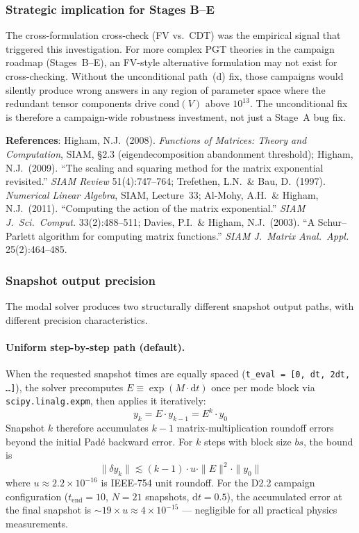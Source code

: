 \subsubsection{Strategic implication for Stages B--E}

The cross-formulation cross-check (FV vs.\ CDT) was the empirical signal that triggered this investigation. For more complex PGT theories in the campaign roadmap (Stages~B--E), an FV-style alternative formulation may not exist for cross-checking. Without the unconditional path~(d) fix, those campaigns would silently produce wrong answers in any region of parameter space where the redundant tensor components drive $\mathrm{cond}(V)$ above $10^{13}$. The unconditional fix is therefore a campaign-wide robustness investment, not just a Stage~A bug fix.

\textbf{References}: Higham, N.J.\ (2008). \emph{Functions of Matrices: Theory and Computation}, SIAM, \S2.3 (eigendecomposition abandonment threshold); Higham, N.J.\ (2009). ``The scaling and squaring method for the matrix exponential revisited.'' \emph{SIAM Review} 51(4):747--764; Trefethen, L.N.\ \& Bau, D.\ (1997). \emph{Numerical Linear Algebra}, SIAM, Lecture~33; Al-Mohy, A.H.\ \& Higham, N.J.\ (2011). ``Computing the action of the matrix exponential.'' \emph{SIAM J.\ Sci.\ Comput.} 33(2):488--511; Davies, P.I.\ \& Higham, N.J.\ (2003). ``A Schur--Parlett algorithm for computing matrix functions.'' \emph{SIAM J.\ Matrix Anal.\ Appl.} 25(2):464--485.

\subsubsection{Snapshot output precision}
\label{sec:modal-snapshot-precision}

The modal solver produces two structurally different snapshot output paths, with different precision characteristics.

\paragraph{Uniform step-by-step path (default).}
When the requested snapshot times are equally spaced (\texttt{t\_eval = [0, dt, 2dt, \ldots]}), the solver precomputes $E \equiv \exp(M \cdot \mathrm{d}t)$ once per mode block via \texttt{scipy.linalg.expm}, then applies it iteratively:
\begin{equation}
y_k = E \cdot y_{k-1} = E^k \cdot y_0
\end{equation}
Snapshot $k$ therefore accumulates $k-1$ matrix-multiplication roundoff errors beyond the initial Pad\'{e} backward error. For $k$ steps with block size $bs$, the bound is
\begin{equation}
\|\delta y_k\| \lesssim (k-1) \cdot u \cdot \|E\|^2 \cdot \|y_0\|
\end{equation}
where $u \approx 2.2 \times 10^{-16}$ is IEEE-754 unit roundoff. For the D2.2 campaign configuration ($t_\mathrm{end}=10$, $N=21$ snapshots, $\mathrm{d}t=0.5$), the accumulated error at the final snapshot is ${\sim}19 \times u \approx 4 \times 10^{-15}$ --- negligible for all practical physics measurements.

